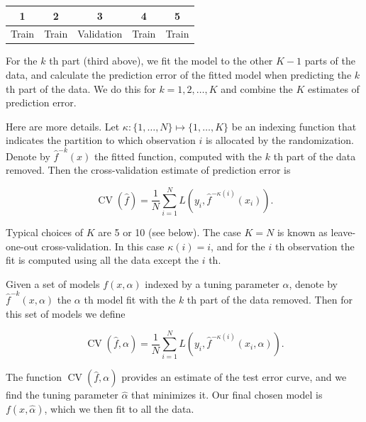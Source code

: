 \documentclass[10pt]{article}
\begin{document}
\begin{center}
\begin{tabular}{|l|c|c|c|c|}
\multicolumn{1}{c}{1} & \multicolumn{1}{c}{2} & \multicolumn{1}{c}{3} & \multicolumn{1}{c}{4} & 5 \\
\hline
Train & Train & Validation & Train & Train \\
\hline
\end{tabular}
\end{center}

For the $k$ th part (third above), we fit the model to the other $K-1$ parts of the data, and calculate the prediction error of the fitted model when predicting the $k$ th part of the data. We do this for $k=1,2, \ldots, K$ and combine the $K$ estimates of prediction error.

Here are more details. Let $\kappa:\{1, \ldots, N\} \mapsto\{1, \ldots, K\}$ be an indexing function that indicates the partition to which observation $i$ is allocated by the randomization. Denote by $\hat{f}^{-k}(x)$ the fitted function, computed with the $k$ th part of the data removed. Then the cross-validation estimate of prediction error is


\begin{equation*}
\operatorname{CV}(\hat{f})=\frac{1}{N} \sum_{i=1}^{N} L\left(y_{i}, \hat{f}^{-\kappa(i)}\left(x_{i}\right)\right) . \tag{7.48}
\end{equation*}


Typical choices of $K$ are 5 or 10 (see below). The case $K=N$ is known as leave-one-out cross-validation. In this case $\kappa(i)=i$, and for the $i$ th observation the fit is computed using all the data except the $i$ th.

Given a set of models $f(x, \alpha)$ indexed by a tuning parameter $\alpha$, denote by $\hat{f}^{-k}(x, \alpha)$ the $\alpha$ th model fit with the $k$ th part of the data removed. Then for this set of models we define


\begin{equation*}
\operatorname{CV}(\hat{f}, \alpha)=\frac{1}{N} \sum_{i=1}^{N} L\left(y_{i}, \hat{f}^{-\kappa(i)}\left(x_{i}, \alpha\right)\right) . \tag{7.49}
\end{equation*}


The function $\operatorname{CV}(\hat{f}, \alpha)$ provides an estimate of the test error curve, and we find the tuning parameter $\hat{\alpha}$ that minimizes it. Our final chosen model is $f(x, \hat{\alpha})$, which we then fit to all the data.
\end{document}
